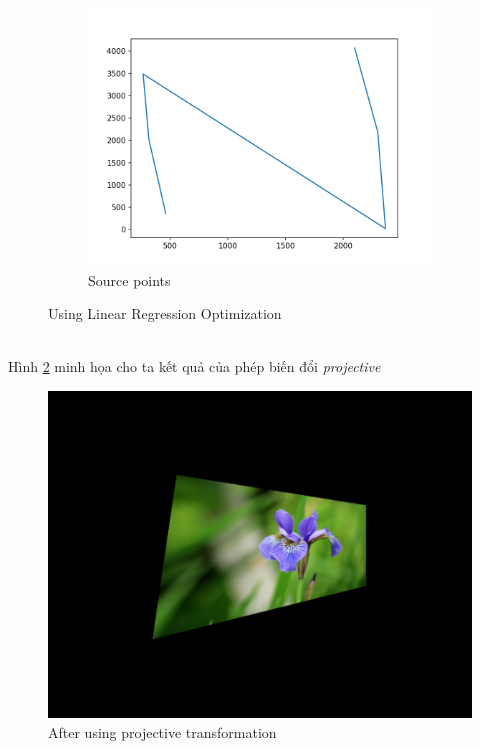 \documentclass{article}
\begin{document}
\begin{figure}[ht!]
    \begin{subfigure}[b]{0.38\linewidth}           \includegraphics[width=\linewidth]{171_2.png}
    \caption{Source points}
    \end{subfigure}
    \caption{Using Linear Regression Optimization}
    \label{im21}
\end{figure}
\phantom{a}\\
Hình \ref{fig9} minh họa cho ta kết quả của phép biến đổi \textit{projective}
\begin{figure}[ht!]
    \centering
    \includegraphics[width = 0.6\linewidth]{fig9.png}
    \caption{After using projective transformation}
    \label{fig9}
\end{figure}
\end{document}
